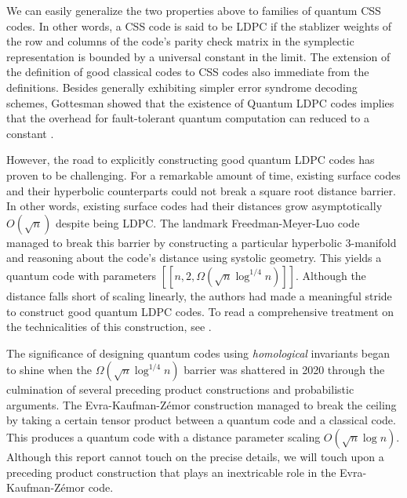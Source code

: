 \documentclass[12pt]{article}%
\theoremstyle{definition}
\begin{document}
We can easily generalize the two properties above to families of quantum CSS codes. In other words, a CSS code is said to be LDPC if the stablizer weights of the row and columns of the code's parity check matrix in the symplectic representation is bounded by a universal constant in the limit. The extension of the definition of good classical codes to CSS codes also immediate from the definitions. Besides generally exhibiting simpler error syndrome decoding schemes, Gottesman showed that the existence of Quantum LDPC codes implies that the overhead for fault-tolerant quantum computation can reduced to a constant \cite{gottesman2013fault}. 

However, the road to explicitly constructing good quantum LDPC codes has proven to be challenging. For a remarkable amount of time, existing surface codes and their hyperbolic counterparts could not break a square root distance barrier. In other words, existing surface codes had their distances grow asymptotically $O(\sqrt{n})$ despite being LDPC. The landmark Freedman-Meyer-Luo code \cite{freedman2002z2} managed to break this barrier by constructing a particular hyperbolic 3-manifold and reasoning about the code's distance using systolic geometry. This yields a quantum code with parameters $[[n, 2, \Omega(\sqrt{n}\log^{1/4}{n})]]$. Although the distance falls short of scaling linearly, the authors had made a meaningful stride to construct good quantum LDPC codes. To read a comprehensive treatment on the technicalities of this construction, see \cite{fetaya2011homological}.

The significance of designing quantum codes using \emph{homological} invariants began to shine when the $\Omega(\sqrt{n}\log^{1/4}{n})$ barrier was shattered in 2020 through the culmination of several preceding product constructions and probabilistic arguments. The Evra-Kaufman-Z\'emor \cite{evra2020decodable} construction managed to break the ceiling by taking a certain tensor product between a quantum code and a classical code. This produces a quantum code with a distance parameter scaling $O(\sqrt{n} \log{n})$. Although this report cannot touch on the precise details, we will touch upon a preceding product construction that plays an inextricable role in the Evra-Kaufman-Z\'emor code.



\end{document}
